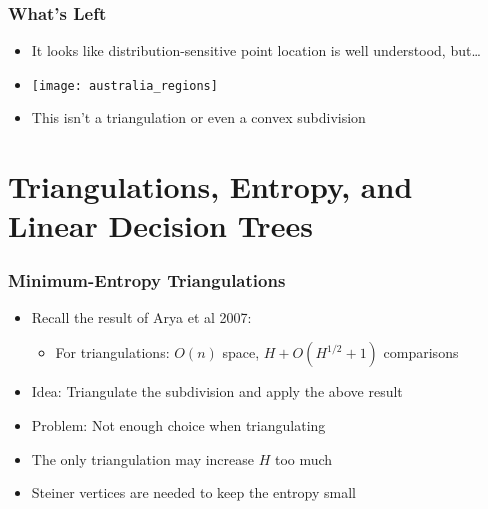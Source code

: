\documentclass{beamer}
\begin{document}
\frame
{
   \frametitle{What's Left}
   \begin{itemize}
   \item<1-> It looks like distribution-sensitive point location is 
	well understood, but\ldots\\
   \item<2->[ ]
      \begin{center}
         \texttt{[image: australia\_regions]}
      \end{center}
   \item<3-> This isn't a triangulation or even a convex subdivision
   \end{itemize}
}

\section{Triangulations, Entropy, and Linear Decision Trees}

\frame
{
   \frametitle{Minimum-Entropy Triangulations}
   \begin{itemize}
   \item<1-> Recall the result of Arya et al 2007:
     \begin{itemize}
      \item For triangulations: $O(n)$ space, $H+O(H^{1/2}+1)$ comparisons
     \end{itemize}
   \item<2-> Idea: Triangulate the subdivision and apply the above result
   \item<3-> Problem: Not enough choice when triangulating
   \item<4-> The only triangulation may increase $H$ too much
   \item<5-> Steiner vertices are needed to keep the entropy
             small
   \end{itemize}
}
\end{document}
